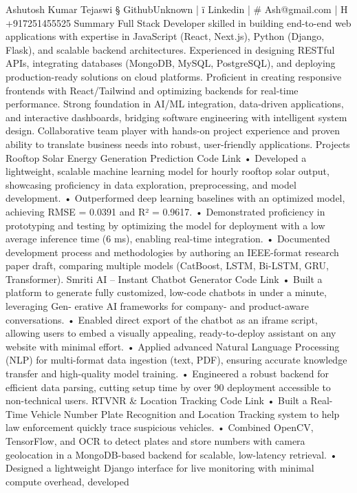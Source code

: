 Ashutosh Kumar Tejaswi
§ GithubUnknown | ï Linkedin | # Ash@gmail.com | H +917251455525
Summary
Full Stack Developer skilled in building end-to-end web applications with expertise in JavaScript (React,
Next.js), Python (Django, Flask), and scalable backend architectures. Experienced in designing RESTful
APIs, integrating databases (MongoDB, MySQL, PostgreSQL), and deploying production-ready solutions
on cloud platforms. Proficient in creating responsive frontends with React/Tailwind and optimizing
backends for real-time performance. Strong foundation in AI/ML integration, data-driven applications,
and interactive dashboards, bridging software engineering with intelligent system design. Collaborative
team player with hands-on project experience and proven ability to translate business needs into robust,
user-friendly applications.
Projects
Rooftop Solar Energy Generation Prediction Code Link
• Developed a lightweight, scalable machine learning model for hourly rooftop solar output, showcasing
proficiency in data exploration, preprocessing, and model development.
• Outperformed deep learning baselines with an optimized model, achieving RMSE = 0.0391 and R²
= 0.9617.
• Demonstrated proficiency in prototyping and testing by optimizing the model for deployment with a
low average inference time (6 ms), enabling real-time integration.
• Documented development process and methodologies by authoring an IEEE-format research paper
draft, comparing multiple models (CatBoost, LSTM, Bi-LSTM, GRU, Transformer).
Smriti AI – Instant Chatbot Generator Code Link
• Built a platform to generate fully customized, low-code chatbots in under a minute, leveraging Gen-
erative AI frameworks for company- and product-aware conversations.
• Enabled direct export of the chatbot as an iframe script, allowing users to embed a visually appealing,
ready-to-deploy assistant on any website with minimal effort.
• Applied advanced Natural Language Processing (NLP) for multi-format data ingestion (text,
PDF), ensuring accurate knowledge transfer and high-quality model training.
• Engineered a robust backend for efficient data parsing, cutting setup time by over 90%
deployment accessible to non-technical users.
RTVNR & Location Tracking Code Link
• Built a Real-Time Vehicle Number Plate Recognition and Location Tracking system to help
law enforcement quickly trace suspicious vehicles.
• Combined OpenCV, TensorFlow, and OCR to detect plates and store numbers with camera geolocation
in a MongoDB-based backend for scalable, low-latency retrieval.
• Designed a lightweight Django interface for live monitoring with minimal compute overhead, developed
